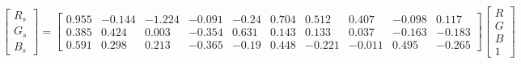 \begin{equation}
\begin{bmatrix}
  R_s \\ G_s \\ B_s 
\end{bmatrix}=
\left[\begin{matrix}0.955 & -0.144 & -1.224 & -0.091 & -0.24 & 0.704 & 0.512 & 0.407 & -0.098 & 0.117\\ 
0.385 & 0.424 & 0.003 & -0.354 & 0.631 & 0.143 & 0.133 & 0.037 & -0.163 & -0.183\\ 
0.591 & 0.298 & 0.213 & -0.365 & -0.19 & 0.448 & -0.221 & -0.011 & 0.495 & -0.265\end{matrix}\right]
\begin{bmatrix}
  R \\ G \\ B \\ 1 
\end{bmatrix}
\end{equation}

